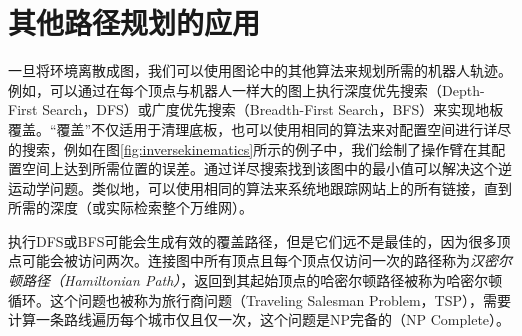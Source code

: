 
\section{其他路径规划的应用}
一旦将环境离散成图，我们可以使用图论中的其他算法来规划所需的机器人轨迹。例如，可以通过在每个顶点与机器人一样大的图上执行深度优先搜索（Depth-First Search，DFS）或广度优先搜索（Breadth-First Search，BFS）来实现地板覆盖。“覆盖”不仅适用于清理底板，也可以使用相同的算法来对配置空间进行详尽的搜索，例如在图\ref{fig:inversekinematics}所示的例子中，我们绘制了操作臂在其配置空间上达到所需位置的误差。通过详尽搜索找到该图中的最小值可以解决这个逆运动学问题。类似地，可以使用相同的算法来系统地跟踪网站上的所有链接，直到所需的深度（或实际检索整个万维网）。


执行DFS或BFS可能会生成有效的覆盖路径，但是它们远不是最佳的，因为很多顶点可能会被访问两次。连接图中所有顶点且每个顶点仅访问一次的路径称为\emph{汉密尔顿路径（Hamiltonian Path）}，返回到其起始顶点的哈密尔顿路径被称为哈密尔顿循环。这个问题也被称为旅行商问题（Traveling Salesman Problem，TSP），需要计算一条路线遍历每个城市仅且仅一次，这个问题是NP完备的（NP Complete）。

